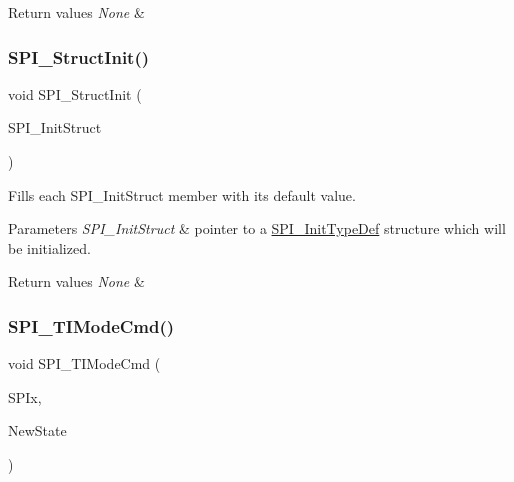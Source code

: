 \begin{DoxyRetVals}{Return values}
{\em None} & \\
\hline
\end{DoxyRetVals}
\mbox{\label{group___s_p_i_ga9a0116f88cc2c4478c270f05608703f1}} 
\subsubsection{\texorpdfstring{S\+P\+I\+\_\+\+Struct\+Init()}{SPI\_StructInit()}}
{\footnotesize\ttfamily void S\+P\+I\+\_\+\+Struct\+Init (\begin{DoxyParamCaption}\item[{\mbox{\hyperlink{struct_s_p_i___init_type_def}{S\+P\+I\+\_\+\+Init\+Type\+Def}} $\ast$}]{S\+P\+I\+\_\+\+Init\+Struct }\end{DoxyParamCaption})}



Fills each S\+P\+I\+\_\+\+Init\+Struct member with its default value. 


\begin{DoxyParams}{Parameters}
{\em S\+P\+I\+\_\+\+Init\+Struct} & pointer to a \mbox{\hyperlink{struct_s_p_i___init_type_def}{S\+P\+I\+\_\+\+Init\+Type\+Def}} structure which will be initialized. \\
\hline
\end{DoxyParams}

\begin{DoxyRetVals}{Return values}
{\em None} & \\
\hline
\end{DoxyRetVals}
\mbox{\label{group___s_p_i_ga74594bf32e3bf4905ac7a2deef8eb475}} 
\subsubsection{\texorpdfstring{S\+P\+I\+\_\+\+T\+I\+Mode\+Cmd()}{SPI\_TIModeCmd()}}
{\footnotesize\ttfamily void S\+P\+I\+\_\+\+T\+I\+Mode\+Cmd (\begin{DoxyParamCaption}\item[{S\+P\+I\+\_\+\+Type\+Def $\ast$}]{S\+P\+Ix,  }\item[{Functional\+State}]{New\+State }\end{DoxyParamCaption})}




